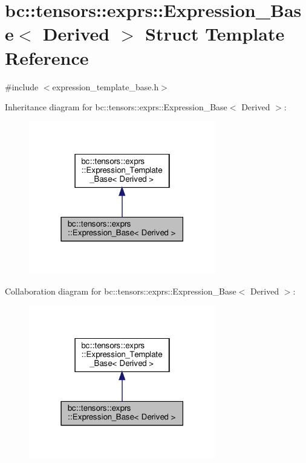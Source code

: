 \hypertarget{structbc_1_1tensors_1_1exprs_1_1Expression__Base}{}\section{bc\+:\+:tensors\+:\+:exprs\+:\+:Expression\+\_\+\+Base$<$ Derived $>$ Struct Template Reference}
\label{structbc_1_1tensors_1_1exprs_1_1Expression__Base}


{\ttfamily \#include $<$expression\+\_\+template\+\_\+base.\+h$>$}



Inheritance diagram for bc\+:\+:tensors\+:\+:exprs\+:\+:Expression\+\_\+\+Base$<$ Derived $>$\+:\nopagebreak
\begin{figure}[H]
\begin{center}
\leavevmode
\includegraphics[width=231pt]{structbc_1_1tensors_1_1exprs_1_1Expression__Base__inherit__graph}
\end{center}
\end{figure}


Collaboration diagram for bc\+:\+:tensors\+:\+:exprs\+:\+:Expression\+\_\+\+Base$<$ Derived $>$\+:\nopagebreak
\begin{figure}[H]
\begin{center}
\leavevmode
\includegraphics[width=231pt]{structbc_1_1tensors_1_1exprs_1_1Expression__Base__coll__graph}
\end{center}
\end{figure}

